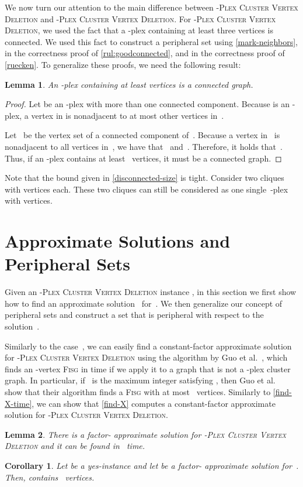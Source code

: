 \documentclass[12pt, a4paper, abstracton]{scrreprt}
\renewcommand{\cite}{~\citep}
\newcommand{\name}{\textsc}
\newcommand{\pvd}[1]{\name{\mbox{-Plex} Cluster Vertex Deletion}}
\newcommand{\pl}[1]{\mbox{-plex}}
\newcommand{\pcg}[1]{\pl #1 cluster graph}
\newcommand{\FISG}{\textsc{Fisg}}
\newcounter{theorem}
\newtheorem{korollar}{Corollary}[chapter]
\newtheorem{lemma}{Lemma}[chapter]
\theoremstyle{definition}
\theoremstyle{remark}
\begin{document}
We now turn our attention to the main difference between \pvd 2 and \pvd s.  For \pvd 2, we used the fact that a \pl 2 containing at least three vertices is connected. We used this fact to construct a peripheral set using \autoref{mark-neighbors}, in the correctness proof of \autoref{rul:goodconnected}, and in the correctness proof of \autoref{ruecken}. To generalize these proofs, we need the following result:
 
\begin{lemma}\label{disconnected-size}
  An \pl s containing at least  vertices is a connected graph.
\end{lemma}
 
\begin{proof}
  Let  be an \pl s with more than one connected component. Because  is an \pl s, a vertex in  is nonadjacent to at most  other vertices in~.

  Let~ be the vertex set of a connected component of~. Because a vertex in~ is nonadjacent to all vertices in~, we have that~ and~. Therefore, it holds that~. Thus, if an \pl s contains at least~ vertices, it must be a connected graph.
\end{proof}
 
\noindent Note that the bound given in \autoref{disconnected-size} is tight. Consider two cliques with  vertices
  each. These two cliques can still be considered as one single~-plex with  vertices.

\section{Approximate Solutions and Peripheral Sets}\label{per-sec}
Given an \pvd s instance , in this section we first show how to
find an approximate solution~ for~. We then generalize our
concept of peripheral sets and construct a set that is peripheral with
respect to the solution~.

Similarly to the case~, we can easily find a constant-factor approximate solution for \pvd s using the algorithm by Guo et al.\cite{DBLP:conf/aaim/GuoKNU09}, which finds an -vertex \FISG{} in  time if we apply it to a graph that is not a \pcg{s}. In particular, if~ is the maximum integer satisfying , then Guo et al.\cite{DBLP:conf/aaim/GuoKNU09} show that their algorithm finds a \FISG{} with at most~ vertices. Similarly to \autoref{find-X-time}, we can show that \autoref{find-X} computes a constant-factor approximate solution for \pvd s.
 
\begin{lemma}\label{find-X-time-s}
  There is a factor- approximate solution for \pvd s and it can be found in ~time.
\end{lemma}
\begin{korollar}\label{X-boundary-s}
  Let  be a yes-instance and let  be a factor- approximate solution for~. Then,  contains ~vertices.
\end{korollar}
\end{document}
